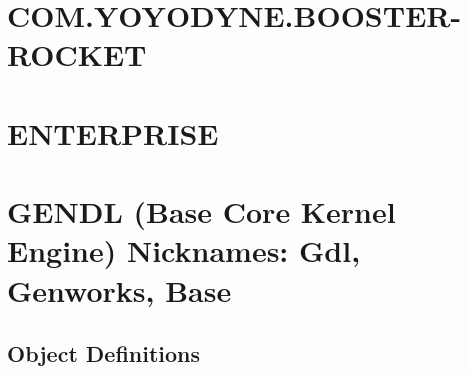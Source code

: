 \documentclass [11pt]{book}
\begin{document}
\label{sec:com.genworks.dom-writers}







\section{COM.YOYODYNE.BOOSTER-ROCKET }

\label{sec:com.yoyodyne.booster-rocket}







\section{ENTERPRISE }

\label{sec:enterprise}







\section{GENDL (Base Core Kernel Engine) Nicknames: Gdl, Genworks, Base}

\label{sec:gendl(basecorekernelengine)nicknames:gdl,genworks,base}





\subsection{Object Definitions}

\label{subsec:objectdefinitions}
\end{document}
